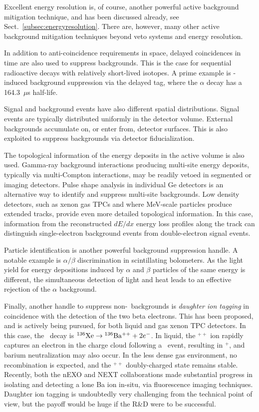 Excellent energy resolution is, of course, another powerful active background mitigation technique, and has been discussed already, see Sect.~\ref{subsec:energyresolution}. There are, however, many other active background mitigation techniques beyond veto systems and energy resolution. 

In addition to anti-coincidence requirements in space, delayed coincidences in time are also used to suppress backgrounds. This is the case for sequential radioactive decays with relatively short-lived isotopes. A prime example is -induced background suppression via the delayed  tag, where the  $\alpha$ decay has a 164.3~$\mu$s half-life. 

Signal and background events have also different spatial distributions. Signal events are typically distributed uniformly in the detector volume. External backgrounds accumulate on, or enter from, detector surfaces. This is also exploited to suppress backgrounds via detector fiducialization. 

The topological information of the energy deposits in the active volume is also used. Gamma-ray background interactions producing multi-site energy deposits, typically via multi-Compton interactions, may be readily vetoed in segmented or imaging detectors. Pulse shape analysis in individual Ge detectors is an alternative way to identify and suppress multi-site backgrounds. Low density detectors, such as xenon gas TPCs and where MeV-scale particles produce extended tracks, provide even more detailed topological information. In this case, information from the reconstructed $dE/dx$ energy loss profiles along the track can distinguish single-electron background events from double-electron signal events.

Particle identification is another powerful background suppression handle. A notable example is $\alpha/\beta$ discrimination in scintillating bolometers. As the light yield for energy depositions induced by $\alpha$ and $\beta$ particles of the same energy is different, the simultaneous detection of light and heat leads to an effective rejection of the $\alpha$ background. 

Finally, another handle to suppress non-\bbtnu\ backgrounds is \emph{daughter ion tagging} in coincidence with the detection of the two beta electrons. This has been proposed, and is actively being pursued, for both liquid and gas xenon TPC detectors. In this case, the \bbonu\ decay is ${\rm ^{136}Xe}\to {\rm ^{136}Ba^{++}}+2e^-$. In liquid, the $^{++}$ ion rapidly captures an electron in the charge cloud following a \bb\ event, resulting in $^{+}$, and barium neutralization may also occur. In the less dense gas environment, no recombination is expected, and the $^{++}$ doubly-charged state remains stable. Recently, both the nEXO \cite{nEXO:2018nxx} and NEXT \cite{McDonald:2017izm,Rivilla:2020cvm} collaborations made substantial progress in isolating and detecting a lone Ba ion in-situ, via fluorescence imaging techniques. Daughter ion tagging is undoubtedly very challenging from the technical point of view, but the payoff would be huge if the R\&D were to be successful.

